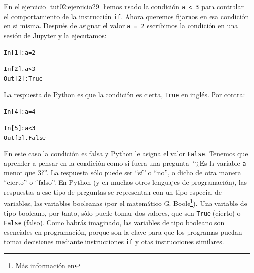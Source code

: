 \documentclass[10pt,a4paper]{article}\usepackage[]{graphicx}\usepackage[]{color}
\makeatletter
\newcommand{\hlnum}[1]{\textcolor[rgb]{0.686,0.059,0.569}{#1}}%
\newcommand{\hlopt}[1]{\textcolor[rgb]{0,0,0}{#1}}%
\newcommand{\hlstd}[1]{\textcolor[rgb]{0.345,0.345,0.345}{#1}}%
\newcommand{\hlkwb}[1]{\textcolor[rgb]{0.69,0.353,0.396}{#1}}%
\newenvironment{kframe}{%
 \def\at@end@of@kframe{}%
 \ifinner\ifhmode%
  \def\at@end@of@kframe{\end{minipage}}%
  \begin{minipage}{\columnwidth}%
 \fi\fi%
 \def\FrameCommand##1{\hskip\@totalleftmargin \hskip-\fboxsep
 \colorbox{shadecolor}{##1}\hskip-\fboxsep
     \hskip-\linewidth \hskip-\@totalleftmargin \hskip\columnwidth}%
 \MakeFramed {\advance\hsize-\width
   \@totalleftmargin\z@ \linewidth\hsize
   \@setminipage}}%
 {\par\unskip\endMakeFramed%
 \at@end@of@kframe}
\newenvironment{knitrout}{}{} %
\newcounter {cont01}
\makeatother
\begin{document}
En el ejercicio \ref{tut02:ejercicio29} hemos usado la condición {\tt a < 3}  para controlar el comportamiento de la instrucción {\tt if}. Ahora queremos fijarnos en esa condición en si misma. Después de asignar el valor {\tt a = 2} escribimos la condición en una sesión de Jupyter y la ejecutamos:
\begin{knitrout}
\color{fgcolor}\begin{kframe}
\begin{alltt}
\hlstd{In [}\hlnum{1}\hlstd{]}\hlopt{:} \hlstd{a} \hlkwb{=} \hlnum{2}

\hlstd{In [}\hlnum{2}\hlstd{]}\hlopt{:} \hlstd{a} \hlopt{<} \hlnum{3}
\hlstd{Out[}\hlnum{2}\hlstd{]}\hlopt{:} \hlstd{True}
\end{alltt}
\end{kframe}
\end{knitrout}
La respuesta de Python es que la condición es cierta, {\tt True} en inglés. Por contra:
\begin{knitrout}
\color{fgcolor}\begin{kframe}
\begin{alltt}
\hlstd{In [}\hlnum{4}\hlstd{]}\hlopt{:} \hlstd{a} \hlkwb{=} \hlnum{4}

\hlstd{In [}\hlnum{5}\hlstd{]}\hlopt{:} \hlstd{a} \hlopt{<} \hlnum{3}
\hlstd{Out[}\hlnum{5}\hlstd{]}\hlopt{:} \hlstd{False}
\end{alltt}
\end{kframe}
\end{knitrout}
En este caso la condición es falsa y Python le asigna el valor {\tt False}. Tenemos que aprender a pensar en la condición como si fuera una pregunta: ``¿Es la variable {\tt a} menor que $3$?''. La respuesta sólo puede ser ``sí'' o ``no'', o dicho de otra manera ``cierto'' o ``falso''. En Python (y en muchos otros lenguajes de programación), las respuestas a ese tipo de preguntas se representan con un tipo especial de variables, las {\sf variables  booleanas} (por el matemático G. Boole\footnote{Más información en  }). Una variable de tipo booleano, por tanto, sólo puede tomar dos valores, que son {\tt True} (cierto) o {\tt False} (falso). Como habrás imaginado, las variables de tipo booleano son esenciales en programación, porque son la clave para que los programas puedan tomar  decisiones mediante instrucciones {\tt if} y otas instrucciones similares.
\end{document}
